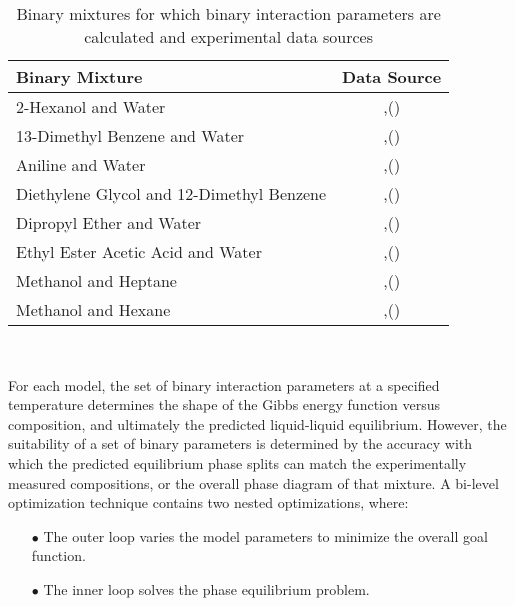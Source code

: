 \begin{table}[h]
\caption{Binary mixtures for which binary interaction parameters are calculated and experimental data sources}
\centering
\begin{tabular}{lc}
\toprule
\textbf{Binary Mixture}&\textbf{Data Source}\\
\midrule
2-Hexanol and Water& \citeauthor{GinningsandWebb},(\citeyear{GinningsandWebb}) \cite{GinningsandWebb} \\
13-Dimethyl Benzene and Water& \citeauthor{ChernoglazovaandSimulin},(\citeyear{ChernoglazovaandSimulin}) \cite{ChernoglazovaandSimulin}\\
Aniline and Water&\citeauthor{Campbell},(\citeyear{Campbell}) \cite{Campbell}\\
Diethylene Glycol and 12-Dimethyl Benzene&\citeauthor{LestevaTimofeevChernaya},(\citeyear{LestevaTimofeevChernaya}) \cite{LestevaTimofeevChernaya}\\
Dipropyl Ether and Water&\citeauthor{BennetPhilip},(\citeyear{BennetPhilip}) \cite{BennetPhilip}\\
Ethyl Ester Acetic Acid and Water&\citeauthor{Merriman},(\citeyear{Merriman}) \cite{Merriman}\\
Methanol and Heptane&\citeauthor{TagliaviniArich},(\citeyear{TagliaviniArich}) \cite{TagliaviniArich}\\
Methanol and Hexane&\citeauthor{RadiceKnickle},(\citeyear{RadiceKnickle}) \cite{RadiceKnickle}\\
\bottomrule
\end{tabular}\\
\label{BinarySystemsandReferences}
\end{table}

For each model, the set of binary interaction parameters at a specified temperature determines the shape of the Gibbs energy function versus composition, and ultimately the predicted liquid-liquid equilibrium. However, the suitability of a set of binary parameters is determined by the accuracy with which the predicted equilibrium phase splits can match the experimentally measured compositions, or the overall phase diagram of that mixture. A bi-level optimization technique contains two nested optimizations, where:\

\begin{itemize}
\item[$\bullet$] The outer loop varies the model parameters to minimize the overall goal function.
\item[$\bullet$] The inner loop solves the phase equilibrium problem.
\end{itemize}\

